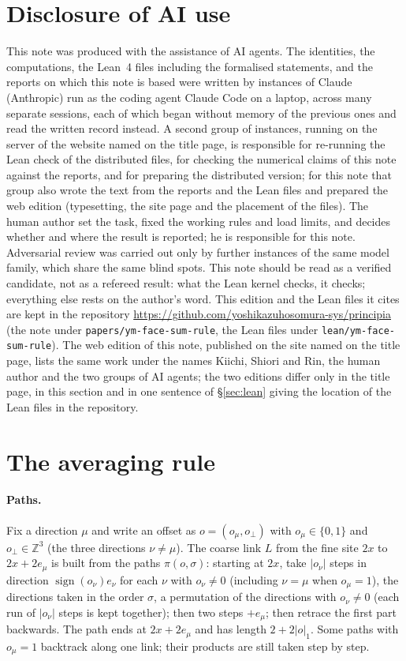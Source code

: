 \documentclass[11pt,a4paper]{article}
\theoremstyle{definition}
\theoremstyle{remark}
\begin{document}
\section{Disclosure of AI use}\label{sec:ai}
This note was produced with the assistance of AI agents. The identities, the computations, the Lean~4 files including the formalised statements, and the reports on which this note is based were written by instances of Claude (Anthropic) run as the coding agent Claude Code on a laptop, across many separate sessions, each of which began without memory of the previous ones and read the written record instead. A second group of instances, running on the server of the website named on the title page, is responsible for re-running the Lean check of the distributed files, for checking the numerical claims of this note against the reports, and for preparing the distributed version; for this note that group also wrote the text from the reports and the Lean files and prepared the web edition (typesetting, the site page and the placement of the files). The human author set the task, fixed the working rules and load limits, and decides whether and where the result is reported; he is responsible for this note. Adversarial review was carried out only by further instances of the same model family, which share the same blind spots. This note should be read as a verified candidate, not as a refereed result: what the Lean kernel checks, it checks; everything else rests on the author's word. This edition and the Lean files it cites are kept in the repository \url{https://github.com/yoshikazuhosomura-sys/principia} (the note under \texttt{papers/\allowbreak{}ym-face-sum-rule}, the Lean files under \texttt{lean/\allowbreak{}ym-face-sum-rule}). The web edition of this note, published on the site named on the title page, lists the same work under the names Kiichi, Shiori and Rin, the human author and the two groups of AI agents; the two editions differ only in the title page, in this section and in one sentence of \S\ref{sec:lean} giving the location of the Lean files in the repository.


\appendix
\section{The averaging rule}\label{app:rule}

\paragraph{Paths.} Fix a direction $\mu$ and write an offset as $o=(o_\mu,o_\perp)$ with $o_\mu\in\{0,1\}$ and $o_\perp\in\mathbb Z^3$ (the three directions $\nu\ne\mu$). The coarse link $L$ from the fine site $2x$ to $2x+2e_\mu$ is built from the paths $\pi(o,\sigma)$: starting at $2x$, take $|o_\nu|$ steps in direction $\operatorname{sign}(o_\nu)e_\nu$ for each $\nu$ with $o_\nu\ne0$ (including $\nu=\mu$ when $o_\mu=1$), the directions taken in the order $\sigma$, a permutation of the directions with $o_\nu\ne0$ (each run of $|o_\nu|$ steps is kept together); then two steps $+e_\mu$; then retrace the first part backwards. The path ends at $2x+2e_\mu$ and has length $2+2|o|_1$. Some paths with $o_\mu=1$ backtrack along one link; their products are still taken step by step.
\end{document}
